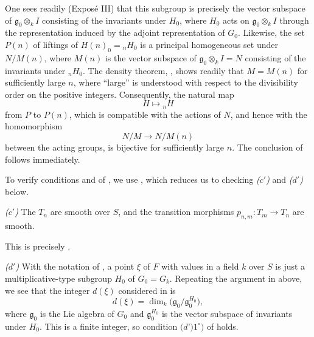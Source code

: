 One sees readily (Exposé III) that this subgroup is precisely the
vector subspace of \(\mathfrak g_0\otimes_kI\) consisting of the
invariants under \(H_0\), where \(H_0\) acts on
\(\mathfrak g_0\otimes_kI\) through the representation induced by
the adjoint representation of \(G_0\).  Likewise, the set \(P(n)\)
of liftings of \(H(n)_0={}_nH_0\) is a principal homogeneous set
under \(N/M(n)\), where \(M(n)\) is the vector subspace of
\(\mathfrak g_0\otimes_kI=N\) consisting of the invariants under
\({}_nH_0\).  The density theorem, , shows readily
that \(M=M(n)\) for sufficiently large \(n\), where ``large'' is
understood with respect to the divisibility order on the positive
integers.  Consequently, the natural map
\[
  H\longmapsto{}_nH
\]
from \(P\) to \(P(n)\), which is compatible with the actions of
\(N\), and hence with the homomorphism
\[
  N/M\longrightarrow N/M(n)
\]
between the acting groups, is bijective for sufficiently large
\(n\).  The conclusion of
 follows immediately.

To verify conditions \textit{} and \textit{} of
, we use
, which reduces us to checking
\textit{(\(c'\))} and \textit{(\(d'\))} below.

\smallskip
\noindent{}
\textit{(\(c'\))} The \(T_n\) are smooth over \(S\), and the
transition morphisms \(p_{n,m}\colon T_m\to T_n\) are smooth.

This is precisely
.

\smallskip
\noindent{}
\textit{(\(d'\))} With the notation of
, a point \(\xi\) of \(F\)
with values in a field \(k\) over \(S\) is just a
multiplicative-type subgroup \(H_0\) of \(G_0=G_k\).  Repeating the
argument in  above, we see that the integer
\(d(\xi)\) considered in
 is
\[
  d(\xi)=\dim_k\bigl(\mathfrak g_0/\mathfrak g_0^{H_0}\bigr),
\]
where \(\mathfrak g_0\) is the Lie algebra of \(G_0\) and
\(\mathfrak g_0^{H_0}\) is the vector subspace of invariants under
\(H_0\).  This is a finite integer, so condition
{\(\textit{(d')}1^\circ\textit{)}\)} of
 holds.

